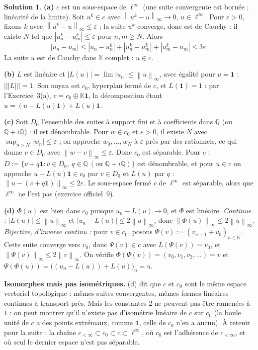 \documentclass[11pt,a4paper]{article}
\newcommand{\N}{\mathbb{N}}
\newcommand{\Q}{\mathbb{Q}}
\newcommand{\K}{\mathbb{K}}
\newcommand{\norm}[1]{\left\|#1\right\|}
\newcommand{\opnorm}[1]{|\!|\!|#1|\!|\!|}
\theoremstyle{definition}
\newtheorem*{solution}{Solution}
\begin{document}
\begin{solution}
\noindent\textbf{(a)} $c$ est un sous-espace de $\ell^\infty$ (une suite convergente est bornée ; linéarité de la limite). Soit $u^k\in c$ avec $\norm{u^k-u}_\infty\to0$, $u\in\ell^\infty$. Pour $\varepsilon>0$, fixons $k$ avec $\norm{u^k-u}_\infty\le\varepsilon$ ; la suite $u^k$ converge, donc est de Cauchy : il existe $N$ tel que $|u^k_n-u^k_m|\le\varepsilon$ pour $n,m\ge N$. Alors
\[
|u_n-u_m|\le|u_n-u^k_n|+|u^k_n-u^k_m|+|u^k_m-u_m|\le3\varepsilon .
\]
La suite $u$ est de Cauchy dans $\K$ complet : $u\in c$.

\medskip
\noindent\textbf{(b)} $L$ est linéaire et $|L(u)|=\lim|u_n|\le\norm u_\infty$, avec égalité pour $u=\mathbf 1$ : $\opnorm L=1$. Son noyau est $c_0$, hyperplan fermé de $c$, et $L(\mathbf 1)=1$ : par l'Exercice~3(a), $c=c_0\oplus\K\mathbf 1$, la décomposition étant $u=(u-L(u)\mathbf 1)+L(u)\mathbf 1$.

\medskip
\noindent\textbf{(c)} Soit $D_0$ l'ensemble des suites à support fini et à coefficients dans $\Q$ (ou $\Q+i\Q$) : il est dénombrable. Pour $w\in c_0$ et $\varepsilon>0$, il existe $N$ avec $\sup_{n>N}|w_n|\le\varepsilon$ ; on approche $w_0,\dots,w_N$ à $\varepsilon$ près par des rationnels, ce qui donne $v\in D_0$ avec $\norm{w-v}_\infty\le\varepsilon$. Donc $c_0$ est séparable. Pour $c$ : $D:=\{v+q\mathbf 1:v\in D_0,\ q\in\Q\ (\text{ou }\Q+i\Q)\}$ est dénombrable, et pour $u\in c$ on approche $u-L(u)\mathbf 1\in c_0$ par $v\in D_0$ et $L(u)$ par $q$ : $\norm{u-(v+q\mathbf 1)}_\infty\le2\varepsilon$. Le sous-espace fermé $c$ de $\ell^\infty$ est séparable, alors que $\ell^\infty$ ne l'est pas (exercice officiel~9).

\medskip
\noindent\textbf{(d)} $\Phi(u)$ est bien dans $c_0$ puisque $u_n-L(u)\to0$, et $\Phi$ est linéaire. \emph{Continue :} $|L(u)|\le\norm u_\infty$ et $|u_n-L(u)|\le2\norm u_\infty$, donc $\norm{\Phi(u)}_\infty\le2\norm u_\infty$. \emph{Bijective, d'inverse continu :} pour $v\in c_0$, posons $\Psi(v):=(v_{n+1}+v_0)_{n\in\N}$. Cette suite converge vers $v_0$, donc $\Psi(v)\in c$ avec $L(\Psi(v))=v_0$, et $\norm{\Psi(v)}_\infty\le2\norm v_\infty$. On vérifie $\Phi(\Psi(v))=(v_0,v_1,v_2,\dots)=v$ et $\Psi(\Phi(u))=\big((u_n-L(u))+L(u)\big)_n=u$.
\end{solution}

\begin{commentaire}
\textbf{Isomorphes mais pas isométriques.} (d) dit que $c$ et $c_0$ sont le même espace vectoriel topologique : mêmes suites convergentes, mêmes formes linéaires continues à transport près. Mais les constantes $2$ ne peuvent pas être ramenées à $1$ : on peut montrer qu'il n'existe pas d'isométrie linéaire de $c$ sur $c_0$ (la boule unité de $c$ a des points extrémaux, comme $\mathbf 1$, celle de $c_0$ n'en a aucun). À retenir pour la suite : la chaîne $c_{<\infty}\subset c_0\subset c\subset\ell^\infty$, où $c_0$ est l'adhérence de $c_{<\infty}$, et où seul le dernier espace n'est pas séparable.
\end{commentaire}
\end{document}
